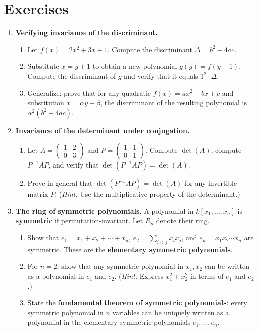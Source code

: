 \section{Exercises}

\begin{enumerate}

    \item \textbf{Verifying invariance of the discriminant.}
    \begin{enumerate}
        \item Let $f(x) = 2x^2 + 3x + 1$. Compute the discriminant $\Delta = b^2 - 4ac$.
        \item Substitute $x = y + 1$ to obtain a new polynomial $g(y) = f(y+1)$. Compute the discriminant of $g$ and verify that it equals $1^2 \cdot \Delta$.
        \item Generalize: prove that for any quadratic $f(x) = ax^2 + bx + c$ and substitution $x = \alpha y + \beta$, the discriminant of the resulting polynomial is $\alpha^2(b^2 - 4ac)$.
    \end{enumerate}

    \item \textbf{Invariance of the determinant under conjugation.}
    \begin{enumerate}
        \item Let $A = \begin{pmatrix} 1 & 2 \\ 0 & 3 \end{pmatrix}$ and $P = \begin{pmatrix} 1 & 1 \\ 0 & 1 \end{pmatrix}$. Compute $\det(A)$, compute $P^{-1}AP$, and verify that $\det(P^{-1}AP) = \det(A)$.
        \item Prove in general that $\det(P^{-1}AP) = \det(A)$ for any invertible matrix $P$. (\emph{Hint:} Use the multiplicative property of the determinant.)
    \end{enumerate}

    \item \textbf{The ring of symmetric polynomials.} A polynomial in $k[x_1,\dots,x_n]$ is \textbf{symmetric} if permutation-invariant. Let $R_n$ denote their ring.
    \begin{enumerate}
        \item Show that $e_1 = x_1 + x_2 + \cdots + x_n$, $e_2 = \sum_{i<j} x_i x_j$, and $e_n = x_1 x_2 \cdots x_n$ are symmetric. These are the \textbf{elementary symmetric polynomials}.
        \item For $n = 2$: show that any symmetric polynomial in $x_1, x_2$ can be written as a polynomial in $e_1$ and $e_2$. (\emph{Hint:} Express $x_1^2 + x_2^2$ in terms of $e_1$ and $e_2$.)
        \item State the \textbf{fundamental theorem of symmetric polynomials}: every symmetric polynomial in $n$ variables can be uniquely written as a polynomial in the elementary symmetric polynomials $e_1, \ldots, e_n$.
    \end{enumerate}


\end{enumerate}
